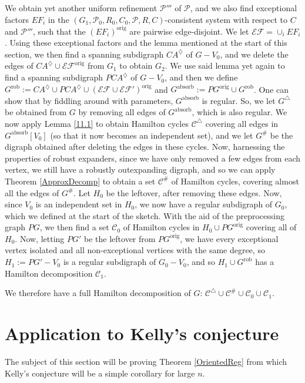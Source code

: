 \documentclass[10pt,letterpaper, reqno]{amsart}
\theoremstyle{definition}
\numberwithin{equation}{section}
\begin{document}
We obtain yet another uniform refinement $\mathcal{P}'''$ of $\mathcal{P}$, and we also find exceptional factors $EF_i$ in the $(G_1,\mathcal{P}_0,R_0,C_0,\mathcal{P}, R,C)$-consistent system with respect to $C$ and $\mathcal{P}'''$, such that the $(EF_i)^\text{orig}$ are pairwise edge-disjoint. We let $\mathcal{EF} = \cup_i EF_i$. Using these exceptional factors and the lemma mentioned at the start of this section, we then find a spanning subdigraph $CA^\diamondsuit$ of $G-V_0$, and we delete the edges of $CA^\diamondsuit \cup \mathcal{EF}^\text{orig}$ from $G_1$ to obtain $G_2$. We use said lemma yet again to find a spanning subdigraph $PCA^\diamondsuit$ of $G-V_0$, and then we define $G^\text{rob} := CA^\diamondsuit \cup PCA^\diamondsuit \cup (\mathcal{EF} \cup \mathcal{EF}')^\text{orig}$ and $G^\text{absorb} := PG^\text{orig} \cup G^\text{rob}$. One can show that by fiddling around with parameters, $G^\text{absorb}$ is regular. So, we let $G^\triangle$ be obtained from $G$ by removing all edges of $G^\text{absorb}$, which is also regular. We now apply Lemma \ref{11.1} to obtain Hamilton cycles $\mathcal{C}^\triangle$ covering all edges in $G^\text{absorb}[V_0]$ (so that it now becomes an independent set), and we let $G^\#$ be the digraph obtained after deleting the edges in these cycles. Now, harnessing the properties of robust expanders, since we have only removed a few edges from each vertex, we still have a robustly outexpanding digraph, and so we can apply Theorem \ref{ApproxDecomp} to obtain a set $\mathcal{C}^\#$ of Hamilton cycles, covering almost all the edges of $G^\#$. Let $H_0$ be the leftover, after removing these edges. Now, since $V_0$ is an independent set in $H_0$, we now have a regular subdigraph of $G_0$, which we defined at the start of the sketch. With the aid of the preprocessing graph $PG$, we then find a set $\mathcal{C}_0$ of Hamilton cycles in $H_0 \cup PG^\text{orig}$ covering all of $H_0$. Now, letting $PG'$ be the leftover from $PG^\text{orig}$, we have every exceptional vertex isolated and all non-exceptional vertices with the same degree, so $H_1:=PG'-V_0$ is a regular subdigraph of $G_0-V_0$, and so $H_1 \cup G^\text{rob}$ has a Hamilton decomposition $\mathcal{C}_1$. 

We therefore have a full Hamilton decomposition of $G$: $\mathcal{C}^\triangle \cup \mathcal{C}^\# \cup \mathcal{C}_0 \cup \mathcal{C}_1$.

\section{Application to Kelly's conjecture}\label{Kelly}
\noindent The subject of this section will be proving Theorem \ref{OrientedReg} from which Kelly's conjecture will be a simple corollary for large $n$.
\end{document}

